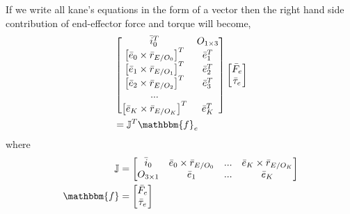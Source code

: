\documentclass[a4paper,10pt]{article}
\begin{document}
If we write all kane's equations in the form of a vector then the right hand side contribution of end-effector force and torque will become,
\begin{align}
 &\left[\begin{matrix}
 \bar{i}_0^T & O_{1\times3}  \\
 \left[\bar{e}_0 \times \bar{r}_{E/O_0}\right]^T & \bar{e}_1^T  \\
 \left[\bar{e}_1 \times \bar{r}_{E/O_1}\right]^T & \bar{e}_2^T  \\
 \left[\bar{e}_2 \times \bar{r}_{E/O_2}\right]^T & \bar{e}_3^T  \\
 ... & \\
 \left[\bar{e}_K \times \bar{r}_{E/O_K}\right]^T & \bar{e}_K^T  \\ 
 \end{matrix} \right]
 \left[\begin{matrix} \bar{F}_e \\ \bar{\tau}_e \end{matrix} \right] \nonumber \\ 
 &= \mathbb{J}^T\mathbbm{f}_e \label{endEff2}
\end{align}
where
\begin{align}
 \mathbb{J} &= \left[\begin{matrix} \bar{i}_0 & \bar{e}_0 \times \bar{r}_{E/O_0} & ... & \bar{e}_K \times \bar{r}_{E/O_K} \\ O_{3\times1} & \bar{e}_1 & ... & \bar{e}_K\end{matrix} \right] \nonumber \\
 \mathbbm{f} &= \left[\begin{matrix} \bar{F}_e \\ \bar{\tau}_e \end{matrix} \right] \nonumber
\end{align}
\end{document}
